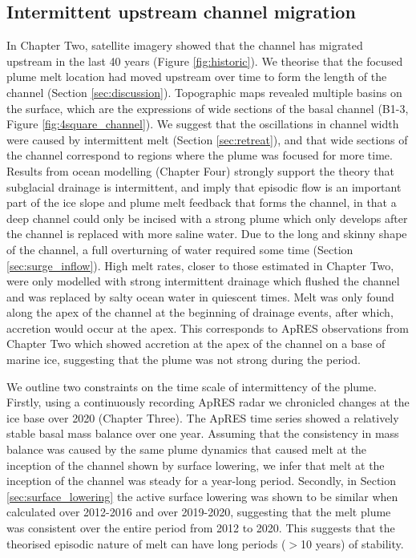 \subsection{Intermittent upstream channel migration}

In Chapter Two, satellite imagery showed that the channel has migrated upstream in the last 40 years (Figure \ref{fig:historic}).  We theorise that the focused plume melt location had moved upstream over time to form the length of the channel (Section \ref{sec:discussion}). Topographic maps revealed multiple basins on the surface, which are the expressions of wide sections of the basal channel (B1-3, Figure \ref{fig:4square_channel}). We suggest that the oscillations in channel width were  caused by intermittent melt (Section \ref{sec:retreat}), and that wide sections of the channel correspond to regions where the plume was focused for more time.
Results from ocean modelling (Chapter Four) strongly support the theory that subglacial drainage is intermittent, and imply that episodic flow is an important part of the ice slope and plume melt feedback that forms the channel, in that a deep channel could only be incised with a strong plume which only develops after the channel is replaced with more saline water. Due to the long and skinny shape of the channel, a full overturning of water required some time (Section \ref{sec:surge_inflow}).  High melt rates, closer to those estimated in Chapter Two, were only modelled with strong intermittent drainage which flushed the channel and was replaced by salty ocean water in quiescent times. 
Melt was only found along the apex of the channel at the beginning of drainage events, after which, accretion would occur at the apex. This corresponds to ApRES observations from Chapter Two which showed accretion at the apex of the channel on a base of marine ice, suggesting that the plume was not strong during the period. 

We outline two constraints on the time scale of intermittency of the plume. Firstly, using a continuously recording ApRES radar we chronicled changes at the ice base over 2020 (Chapter Three). The ApRES time series showed a relatively stable basal mass balance over one year. Assuming that the consistency in mass balance was caused by the same plume dynamics that caused melt at the inception of the channel shown by surface lowering, we infer that melt at the inception of the channel was steady for a year-long period. Secondly, in Section \ref{sec:surface_lowering} the active surface lowering was shown to be similar when calculated over 2012-2016 and over 2019-2020, suggesting that the melt plume was consistent over the entire period from 2012 to 2020. This suggests that the theorised episodic nature of melt can have long periods ($>$10 years) of stability.

